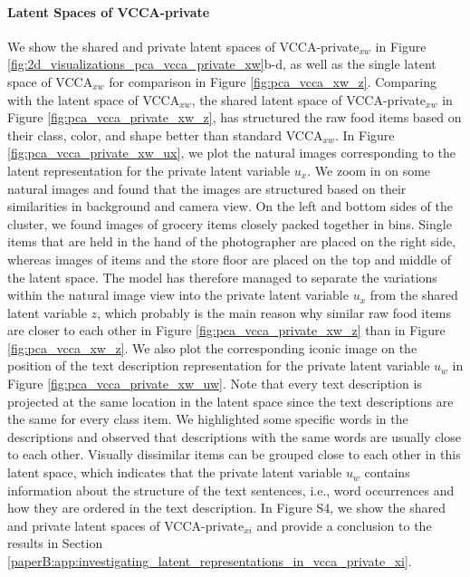 

\vspace{-3mm}
\paragraph{Latent Spaces of VCCA-private } We show the shared and private latent spaces of VCCA-private$_{x w}$ in Figure \ref{fig:2d_visualizations_pca_vcca_private_xw}b-d, as well as the single latent space of VCCA$_{x w}$ for comparison in Figure \ref{fig:pca_vcca_xw_z}. 
Comparing with the latent space of VCCA$_{x w}$, the shared latent space of VCCA-private$_{x w}$ in Figure \ref{fig:pca_vcca_private_xw_z}, has structured the raw food items based on their class, color, and shape better than standard VCCA$_{x w}$. In Figure \ref{fig:pca_vcca_private_xw_ux}, we plot the natural images corresponding to the latent representation for the private latent variable $u_{x}$. We zoom in on some natural images and found that the images are structured based on their similarities in background and camera view. On the left and bottom sides of the cluster, we found images of grocery items closely packed together in bins. Single items that are held in the hand of the photographer are placed on the right side, whereas images of items and the store floor are placed on the top and middle of the latent space. The model has therefore managed to separate the variations within the natural image view into the private latent variable $u_{x}$ from the shared latent variable $z$, which probably is the main reason why similar raw food items are closer to each other in Figure \ref{fig:pca_vcca_private_xw_z} than in Figure \ref{fig:pca_vcca_xw_z}. We also plot the corresponding iconic image on the position of the text description representation for the private latent variable $u_{w}$ in Figure \ref{fig:pca_vcca_private_xw_uw}. Note that every text description is projected at the same location in the latent space since the text descriptions are the same for every class item. We highlighted some specific words in the descriptions and observed that descriptions with the same words are usually close to each other. Visually dissimilar items can be grouped close to each other in this latent space, which indicates that the private latent variable $u_{w}$ contains information about the structure of the text sentences, i.e., word occurrences and how they are ordered in the text description. 
In Figure S4, we show the shared and private latent spaces of VCCA-private$_{x i}$ and provide a conclusion to the results in Section \ref{paperB:app:investigating_latent_representations_in_vcca_private_xi}. %

